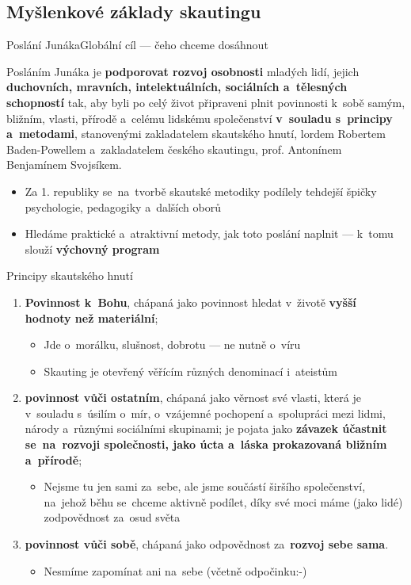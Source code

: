\documentclass[compress, ucs, xelatex, 11pt, xcolor=dvipsnames, print,
	hyperref={
		bookmarks=true,
		unicode=true,
		colorlinks=true,
		pdftitle={Skautska vychovna metoda},
		plainpages=false,
		pdfauthor={Vojtech Zeisek},
		pdfsubject={Skautska vychovna metoda a jeji vyvoj za posledni stoleti a desetileti},
		pdfcreator={XeLaTeX},
		pdfkeywords={Junak, Pedagogika, Skaut, Skauting, Vychovna metoda},
		linkcolor=Black,
		anchorcolor=Black,
		citecolor=OliveGreen,
		filecolor=OliveGreen,
		menucolor=Black,
		urlcolor=OliveGreen,
		pdftex},
	url={hyphens, lowtilde} %
	]{beamer}
\begin{document}
\subsection{Myšlenkové základy skautingu}

\begin{frame}{Poslání Junáka}{Globální cíl --- čeho chceme dosáhnout}
	\begin{center}
		\begin{Large}
			Posláním Junáka je \textbf{podporovat rozvoj osobnosti} mladých lidí, jejich \textbf{duchovních, mravních, intelektuálních, sociálních a~tělesných schopností} tak, aby byli po celý život připraveni plnit povinnosti k~sobě samým, bližním, vlasti, přírodě a~celému lidskému společenství \textbf{v~souladu s~principy a~metodami}, stanovenými zakladatelem skautského hnutí, lordem Robertem Baden-Powellem a~zakladatelem českého skautingu, prof. Antonínem Benjamínem Svojsíkem.
		\end{Large}
	\end{center}
	\begin{itemize}
		\item Za 1. republiky se~na~tvorbě skautské metodiky podílely tehdejší špičky psychologie, pedagogiky a~dalších oborů
		\item Hledáme praktické a~atraktivní metody, jak toto poslání naplnit --- k~tomu slouží \textbf{výchovný program}
	\end{itemize}
\end{frame}

\begin{frame}{Principy skautského hnutí}
	\begin{enumerate}
		\item \textbf{Povinnost k~Bohu}, chápaná jako povinnost hledat v~životě \textbf{vyšší hodnoty než materiální};
		\begin{itemize}
			\item Jde o~morálku, slušnost, dobrotu --- ne nutně o~víru
			\item Skauting je otevřený věřícím různých denominací i~ateistům
		\end{itemize}
		\item \textbf{povinnost vůči ostatním}, chápaná jako věrnost své vlasti, která je v~souladu s~úsilím o~mír, o~vzájemné pochopení a~spolupráci mezi lidmi, národy a~různými sociálními skupinami; je pojata jako \textbf{závazek účastnit se~na~rozvoji společnosti, jako úcta a~láska prokazovaná bližním a~přírodě};
		\begin{itemize}
			\item Nejsme tu jen sami za~sebe, ale jsme součástí širšího společenství, na~jehož běhu se~chceme aktivně podílet, díky své moci máme (jako lidé) zodpovědnost za~osud světa
		\end{itemize}
		\item \textbf{povinnost vůči sobě}, chápaná jako odpovědnost za~\textbf{rozvoj sebe sama}.
		\begin{itemize}
			\item Nesmíme zapomínat ani na~sebe (včetně odpočinku:-)
		\end{itemize}
	\end{enumerate}
\end{frame}
\end{document}
